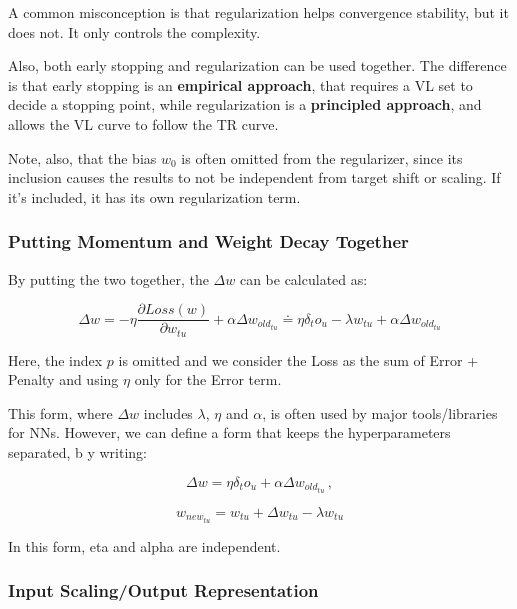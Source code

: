A common misconception is that regularization helps convergence stability, but it does not. It only controls the complexity.

Also, both early stopping and regularization can be used together. The difference is that early stopping is an \textbf{empirical approach}, that requires a VL set to decide a stopping point, while regularization is a \textbf{principled approach}, and allows the VL curve to follow the TR curve.

Note, also, that the bias $w_0$ is often omitted from the regularizer, since its inclusion causes the results to not be independent from target shift or scaling. If it's included, it has its own regularization term.

\subsubsection{Putting Momentum and Weight Decay Together}

By putting the two together, the $\Delta w$ can be calculated as:

\begin{equation*}
    \Delta w = -\eta \dfrac{\partial Loss(w)}{\partial w_{tu}} + \alpha \Delta w_{old_{tu}} \doteq \eta \delta_t o_u - \lambda w_{tu} + \alpha \Delta w_{old_{tu}}
\end{equation*}

Here, the index $p$ is omitted and we consider the Loss as the sum of Error + Penalty and using $\eta$ only for the Error term.

This form, where $\Delta w$ includes $\lambda$, $\eta$ and $\alpha$, is often used by major tools/libraries for NNs. However, we can define a form that keeps the hyperparameters separated, b y writing:

\begin{equation*}
    \Delta w = \eta \delta_t o_u + \alpha \Delta w_{old_{tu}} \, ,
\end{equation*}

\begin{equation*}
    w_{new_{tu}} = w_{tu} + \Delta w_{tu} - \lambda w_{tu} 
\end{equation*}

In this form, eta and alpha are independent.

\subsubsection{Input Scaling/Output Representation}


